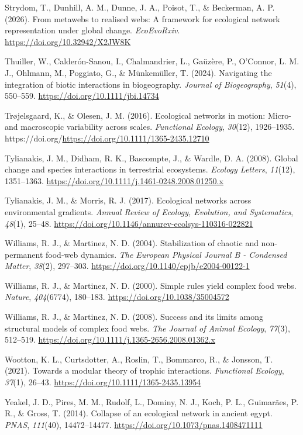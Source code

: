 \documentclass[
]{article}
\newlength{\cslhangindent}
\newenvironment{CSLReferences}[2] %
 {\begin{list}{}{%
  \setlength{\itemindent}{0pt}
  \setlength{\leftmargin}{0pt}
  \setlength{\parsep}{0pt}
  \ifodd #1
   \setlength{\leftmargin}{\cslhangindent}
   \setlength{\itemindent}{-1\cslhangindent}
  \fi
  \setlength{\itemsep}{#2\baselineskip}}}
 {\end{list}}
\begin{document}
\begin{CSLReferences}{1}{0}
Strydom, T., Dunhill, A. M., Dunne, J. A., Poisot, T., \& Beckerman, A.
P. (2026). From metawebs to realised webs: A framework for ecological
network representation under global change. \emph{EcoEvoRxiv}.
\url{https://doi.org/10.32942/X2JW8K}

Thuiller, W., Calderón-Sanou, I., Chalmandrier, L., Gaüzère, P.,
O'Connor, L. M. J., Ohlmann, M., Poggiato, G., \& Münkemüller, T.
(2024). Navigating the integration of biotic interactions in
biogeography. \emph{Journal of Biogeography}, \emph{51}(4), 550--559.
\url{https://doi.org/10.1111/jbi.14734}

Trøjelsgaard, K., \& Olesen, J. M. (2016). Ecological networks in
motion: Micro- and macroscopic variability across scales.
\emph{Functional Ecology}, \emph{30}(12), 1926--1935.
https://doi.org/\url{https://doi.org/10.1111/1365-2435.12710}

Tylianakis, J. M., Didham, R. K., Bascompte, J., \& Wardle, D. A.
(2008). Global change and species interactions in terrestrial
ecosystems. \emph{Ecology Letters}, \emph{11}(12), 1351--1363.
\url{https://doi.org/10.1111/j.1461-0248.2008.01250.x}

Tylianakis, J. M., \& Morris, R. J. (2017). Ecological networks across
environmental gradients. \emph{Annual Review of Ecology, Evolution, and
Systematics}, \emph{48}(1), 25--48.
\url{https://doi.org/10.1146/annurev-ecolsys-110316-022821}

Williams, R. J., \& Martinez, N. D. (2004). Stabilization of chaotic and
non-permanent food-web dynamics. \emph{The European Physical Journal B -
Condensed Matter}, \emph{38}(2), 297--303.
\url{https://doi.org/10.1140/epjb/e2004-00122-1}

Williams, R. J., \& Martinez, N. D. (2000). Simple rules yield complex
food webs. \emph{Nature}, \emph{404}(6774), 180--183.
\url{https://doi.org/10.1038/35004572}

Williams, R. J., \& Martinez, N. D. (2008). Success and its limits among
structural models of complex food webs. \emph{The Journal of Animal
Ecology}, \emph{77}(3), 512--519.
\url{https://doi.org/10.1111/j.1365-2656.2008.01362.x}

Wootton, K. L., Curtsdotter, A., Roslin, T., Bommarco, R., \& Jonsson,
T. (2021). Towards a modular theory of trophic interactions.
\emph{Functional Ecology}, \emph{37}(1), 26--43.
\url{https://doi.org/10.1111/1365-2435.13954}

Yeakel, J. D., Pires, M. M., Rudolf, L., Dominy, N. J., Koch, P. L.,
Guimarães, P. R., \& Gross, T. (2014). Collapse of an ecological network
in ancient egypt. \emph{PNAS}, \emph{111}(40), 14472--14477.
\url{https://doi.org/10.1073/pnas.1408471111}

\end{CSLReferences}
\end{document}
